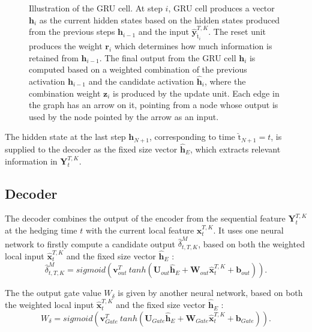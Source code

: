 \documentclass[letterpaper,12pt,titlepage,oneside,final]{book}
\numberwithin{equation}{section}
\theoremstyle{definition}
\newcommand{\vb}{\mathbf{b}}
\newcommand{\vx}{\mathbf{x}}
\newcommand{\vy}{\mathbf{y}}
\newcommand{\vv}{\mathbf{v}}
\newcommand{\vh}{\mathbf{h}}
\newcommand{\vW}{\pmb{W}}
\newcommand{\vU}{\pmb{U}}
\newcommand{\nt}{\breve{\text{t}}}
\begin{document}
\begin{figure}[htp!]
	\caption{Illustration of the GRU cell. 
		At step $i$,  GRU cell produces a vector  $\vh_{i}$ as the current hidden states based on the hidden states produced from the previous steps $\vh_{i-1}$  and the input $\widehat{\vy}^{T,K}_{\nt_{i}}$. The reset unit produces the weight $\mathbf{r}_i$ which determines how much information is retained from $\vh_{i-1}$.  
		The final output from the GRU cell $\vh_{i}$ is  computed based on a weighted combination of the previous activation $\vh_{i-1}$ and the candidate activation $\widehat{\vh}_i$, where the combination weight $\mathbf{z}_i$ is produced by the update unit. Each edge in the graph has an arrow on it, pointing from a node whose output is used by the node pointed by the arrow as an input.}
	\label{fig:RNN}
\end{figure}
The hidden state at the last step $\vh_{N+1}$, corresponding to time ${\nt_{N+1}}={t}$, is supplied to
the decoder as the fixed size vector $\mathbf{\widehat{h}}_E$, which  extracts relevant information in $\mathbf{Y}_{t}^{T,K}$.
\subsection{Decoder}

The decoder combines the output of the encoder from the sequential feature $\mathbf{Y}_{t}^{T,K}$  at the hedging time $t$ with the current local feature $\mathbf{x}_{t}^{T,K}$.
It uses one neural network to firstly compute a candidate output  $\widehat{\delta}^M_{t,T,K}$,  based on both the weighted local input  $\widehat{\vx}_{t}^{T,K}$ and the fixed size vector $\mathbf{\widehat{h}}_E$ :
$$
\widehat{\delta}^M_{t,T,K}=sigmoid (\vv^T_{out} \ tanh( \vU_{out} \mathbf{\widehat{h}}_E + \vW_{out} \widehat{\vx}_{t}^{T,K}+ \vb_{out})).
$$

The the output gate value $W_{\delta}$ is given by another neural network, based on both the weighted local input  $\widehat{\vx}_{t}^{T,K}$ and the fixed size vector $\mathbf{\widehat{h}}_E$ :
\begin{equation}\label{WDel}
W_{\delta}=sigmoid (\vv^T_{Gate} \ tanh( \vU_{Gate} \mathbf{\widehat{h}}_E + \vW_{Gate} \widehat{\vx}_{t}^{T,K}+ \vb_{Gate})).
\end{equation}
\end{document}
